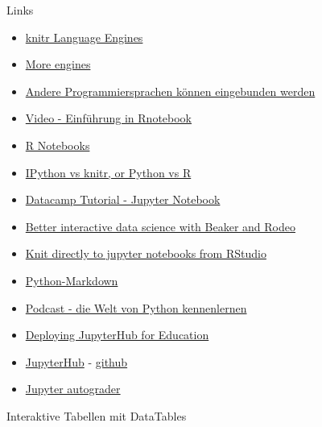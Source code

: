 \documentclass[ignorenonframetext,]{beamer}
\begin{document}
\begin{frame}{Links}

\begin{itemize}
\item
  \href{http://rmarkdown.rstudio.com/authoring_knitr_engines.html}{knitr
  Language Engines}
\item
  \href{https://yihui.name/knitr/demo/engines/}{More engines}
\item
  \href{http://rmarkdown.rstudio.com/authoring_knitr_engines.html}{Andere
  Programmiersprachen können eingebunden werden}
\item
  \href{https://www.rstudio.com/resources/webinars/introducing-notebooks-with-r-markdown/}{Video
  - Einführung in Rnotebook}
\item
  \href{http://rmarkdown.rstudio.com/r_notebooks.html}{R Notebooks}
\item
  \href{https://yihui.name/en/2012/11/ipython-vs-knitr/}{IPython vs
  knitr, or Python vs R}
\item
  \href{https://www.datacamp.com/community/tutorials/tutorial-jupyter-notebook\#gs.kZqvIvI}{Datacamp
  Tutorial - Jupyter Notebook}
\item
  \href{https://blog.dominodatalab.com/interactive-data-science/}{Better
  interactive data science with Beaker and Rodeo}
\item
  \href{https://www.r-bloggers.com/knit-directly-to-jupyter-notebooks-from-rstudio/}{Knit
  directly to jupyter notebooks from RStudio}
\item
  \href{https://pythonhosted.org/Markdown/}{Python-Markdown}
\item
  \href{https://talkpython.fm/episodes/show/96/exploring-awesome-python}{Podcast
  - die Welt von Python kennenlernen}
\item
  \href{https://developer.rackspace.com/blog/deploying-jupyterhub-for-education/}{Deploying
  JupyterHub for Education}
\item
  \href{https://hub.docker.com/r/jupyterhub/jupyterhub/}{JupyterHub} -
  \href{https://github.com/jupyterhub/jupyterhub}{github}
\item
  \href{https://github.com/data-8/connector-instructors/issues/3}{Jupyter
  autograder}
\end{itemize}

\end{frame}

\begin{frame}{Interaktive Tabellen mit DataTables}

\end{frame}
\end{document}
